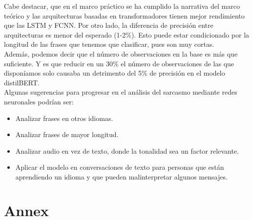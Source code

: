 \documentclass[10pt,riqno,a4paper,twoside]{article}\usepackage[]{graphicx}\usepackage[]{color}
\begin{document}
Cabe destacar, que en el marco práctico se ha cumplido la narrativa del marco teórico y las arquitecturas basadas en transformadores tienen mejor rendimiento que las LSTM y FCNN. Por otro lado, la diferencia de precisión entre arquitecturas es menor del esperado (1-2\%). Esto puede estar condicionado por la longitud de las frases que tenemos que clasificar, pues son muy cortas. \\


Además, podemos decir que el número de observaciones en la base es más que suficiente. Y es que reducir en un 30\% el número de observaciones de las que disponíamos solo causaba un detrimento del 5\% de precisión en el modelo distilBERT.\\

Algunas sugerencias para progresar en el análisis del sarcasmo mediante redes neuronales podrían ser: 

\begin{itemize}
\item{Analizar frases en otros idiomas.}
\item{Analizar frases de mayor longitud.}
\item{Analizar audio en vez de texto, donde la tonalidad sea un factor relevante.}
\item{Aplicar el modelo en conversaciones de texto para personas que están aprendiendo un idioma y que pueden malinterpretar algunos mensajes.}

\end{itemize}


\clearpage




\clearpage
\section{Annex}
\end{document}

